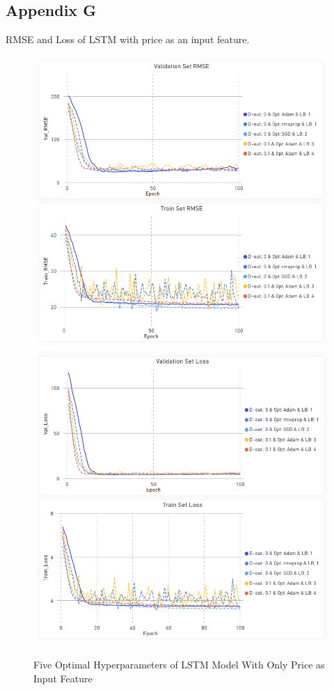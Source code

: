 \documentclass[11pt, a4paper]{article}
\begin{document}
\subsection{Appendix G}
\label{appendix:RMSE_Loss_Best_Model}
RMSE and Loss of LSTM with price as an input feature.
\begin{figure}[!hb]
    \centering
    \includegraphics[scale = 0.4]{Only_Price_Params_RMSE.png}
    \includegraphics[scale = 0.4]{Only_Price_Params_Loss.png}
    \caption{Five Optimal Hyperparameters of LSTM Model With Only Price as Input Feature}
    \label{fig:lstm_price_rmse_loss}
\end{figure}
\end{document}
